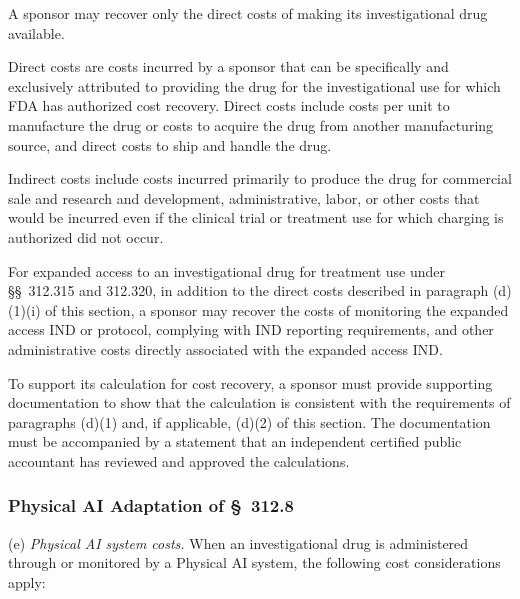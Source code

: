 \documentclass[11pt]{article}
\begin{document}
\begin{description}[leftmargin=0.5cm,style=sameline]
\item[(1)] A sponsor may recover only the direct costs of making its investigational drug available.
\begin{description}[leftmargin=0.8cm,style=sameline]
\item[(i)] Direct costs are costs incurred by a sponsor that can be specifically and exclusively attributed to providing the drug for the investigational use for which FDA has authorized cost recovery. Direct costs include costs per unit to manufacture the drug or costs to acquire the drug from another manufacturing source, and direct costs to ship and handle the drug.
\item[(ii)] Indirect costs include costs incurred primarily to produce the drug for commercial sale and research and development, administrative, labor, or other costs that would be incurred even if the clinical trial or treatment use for which charging is authorized did not occur.
\end{description}
\item[(2)] For expanded access to an investigational drug for treatment use under \S\S~312.315 and 312.320, in addition to the direct costs described in paragraph (d)(1)(i) of this section, a sponsor may recover the costs of monitoring the expanded access IND or protocol, complying with IND reporting requirements, and other administrative costs directly associated with the expanded access IND.
\item[(3)] To support its calculation for cost recovery, a sponsor must provide supporting documentation to show that the calculation is consistent with the requirements of paragraphs (d)(1) and, if applicable, (d)(2) of this section. The documentation must be accompanied by a statement that an independent certified public accountant has reviewed and approved the calculations.
\end{description}

\subsubsection{Physical AI Adaptation of \S~312.8}

(e) \textit{Physical AI system costs.} When an investigational drug is administered through or monitored by a Physical AI system, the following cost considerations apply:
\end{document}
